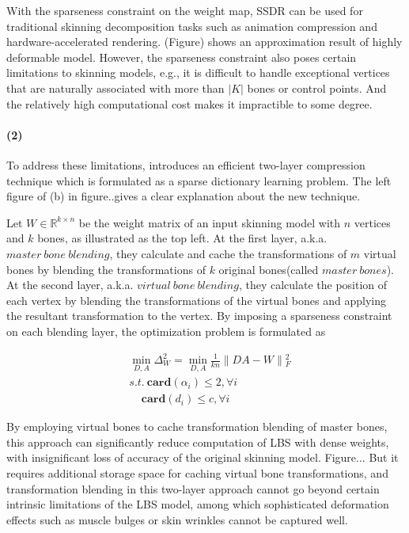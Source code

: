 With the sparseness constraint on the weight map, SSDR can be used for traditional skinning decomposition tasks such as animation compression and hardware-accelerated rendering.
(Figure) shows an approximation result of highly deformable model.
However, the sparseness constraint also poses certain limitations to skinning models,
e.g., it is difficult to handle exceptional vertices that are naturally associated with more than $|K|$ bones or control points.
And the relatively high computational cost makes it impractible to some degree.

\paragraph{(2)}
To address these limitations, \cite{le2013two} introduces an efficient two-layer compression technique which is formulated as a sparse dictionary learning problem. The left figure of (b) in figure..gives a clear explanation about the new technique.

Let $W\in\mathbb{R}^{k\times n}$ be the weight matrix of an input skinning model with $n$ vertices and $k$ bones, as illustrated as the top left.
At the first layer, a.k.a. $master~bone~blending$, they calculate and cache the transformations of $m$ virtual bones by blending the transformations of $k$ original bones(called $master~bones$).
At the second layer, a.k.a. $virtual~bone~blending$, they calculate the position of each vertex by blending the transformations of the virtual bones and applying the resultant transformation to the vertex.
By imposing a sparseness constraint on each blending layer, the optimization problem is formulated as

\small{
\begin{equation}
 \label{eq:TwoLayer}
 \begin{split}
 & \min_{D,A}\Delta_{W}^2=\min_{D,A}\frac{1}{kn}\|DA-W\|{_{F}^2} \\
 & s.t.~\textbf{card}(\alpha_{i})\leq2,\forall i\\
 & ~~~~~\textbf{card}(d_{i})\leq c,\forall i
 \end{split}
\end{equation}
}

By employing virtual bones to cache transformation blending of master bones,
this approach can significantly reduce computation of LBS with dense weights, with insignificant loss of accuracy of the original skinning model. Figure...
But it requires additional storage space for caching virtual bone transformations,
and transformation blending in this two-layer approach cannot go beyond certain intrinsic limitations of the LBS model,
among which sophisticated deformation effects such as muscle bulges or skin wrinkles cannot be captured well.



